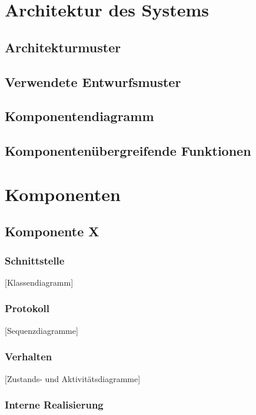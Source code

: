 \documentclass[11pt]{article}
\begin{document}
\section{Architektur des Systems}

\subsection{Architekturmuster}

\subsection{Verwendete Entwurfsmuster}

\subsection{Komponentendiagramm}

\subsection{Komponentenübergreifende Funktionen}

\section{Komponenten}

\subsection{Komponente X}

\subsubsection{Schnittstelle}

[Klassendiagramm]

\subsubsection{Protokoll}

[Sequenzdiagramme]

\subsubsection{Verhalten}

[Zustands- und Aktivitätsdiagramme]

\subsubsection{Interne Realisierung}
\end{document}
